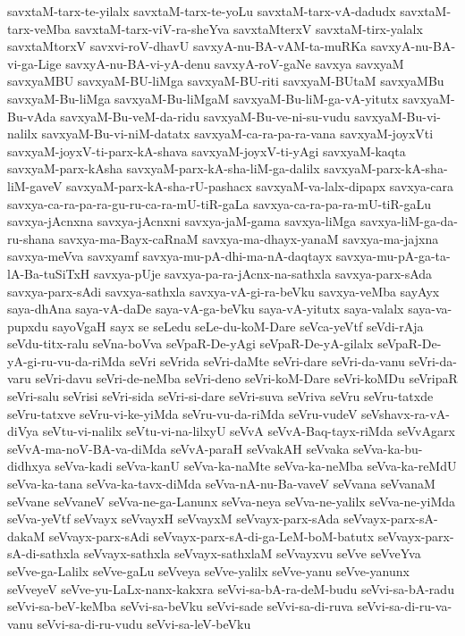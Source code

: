 {savxtaM-tarx-te-yilalx
savxtaM-tarx-te-yoLu
savxtaM-tarx-vA-dadudx
savxtaM-tarx-veMba
savxtaM-tarx-viV-ra-sheYva
savxtaMterxV
savxtaM-tirx-yalalx
savxtaMtorxV
savxvi-roV-dhavU
savxyA-nu-BA-vAM-ta-muRKa
savxyA-nu-BA-vi-ga-Lige
savxyA-nu-BA-vi-yA-denu
savxyA-roV-gaNe
savxya
savxyaM
savxyaMBU
savxyaM-BU-liMga
savxyaM-BU-riti
savxyaM-BUtaM
savxyaMBu
savxyaM-Bu-liMga
savxyaM-Bu-liMgaM
savxyaM-Bu-liM-ga-vA-yitutx
savxyaM-Bu-vAda
savxyaM-Bu-veM-da-ridu
savxyaM-Bu-ve-ni-su-vudu
savxyaM-Bu-vi-nalilx
savxyaM-Bu-vi-niM-datatx
savxyaM-ca-ra-pa-ra-vana
savxyaM-joyxVti
savxyaM-joyxV-ti-parx-kA-shava
savxyaM-joyxV-ti-yAgi
savxyaM-kaqta
savxyaM-parx-kAsha
savxyaM-parx-kA-sha-liM-ga-dalilx
savxyaM-parx-kA-sha-liM-gaveV
savxyaM-parx-kA-sha-rU-pashacx
savxyaM-va-lalx-dipapx
savxya-cara
savxya-ca-ra-pa-ra-gu-ru-ca-ra-mU-tiR-gaLa
savxya-ca-ra-pa-ra-mU-tiR-gaLu
savxya-jAcnxna
savxya-jAcnxni
savxya-jaM-gama
savxya-liMga
savxya-liM-ga-da-ru-shana
savxya-ma-Bayx-caRnaM
savxya-ma-dhayx-yanaM
savxya-ma-jajxna
savxya-meVva
savxyamf
savxya-mu-pA-dhi-ma-nA-daqtayx
savxya-mu-pA-ga-ta-lA-Ba-tuSiTxH
savxya-pUje
savxya-pa-ra-jAcnx-na-sathxla
savxya-parx-sAda
savxya-parx-sAdi
savxya-sathxla
savxya-vA-gi-ra-beVku
savxya-veMba
sayAyx
saya-dhAna
saya-vA-daDe
saya-vA-ga-beVku
saya-vA-yitutx
saya-valalx
saya-va-pupxdu
sayoVgaH
sayx
se
seLedu
seLe-du-koM-Dare
seVca-yeVtf
seVdi-rAja
seVdu-titx-ralu
seVna-boVva
seVpaR-De-yAgi
seVpaR-De-yA-gilalx
seVpaR-De-yA-gi-ru-vu-da-riMda
seVri
seVrida
seVri-daMte
seVri-dare
seVri-da-vanu
seVri-da-varu
seVri-davu
seVri-de-neMba
seVri-deno
seVri-koM-Dare
seVri-koMDu
seVripaR
seVri-salu
seVrisi
seVri-sida
seVri-si-dare
seVri-suva
seVriva
seVru
seVru-tatxde
seVru-tatxve
seVru-vi-ke-yiMda
seVru-vu-da-riMda
seVru-vudeV
seVshavx-ra-vA-diVya
seVtu-vi-nalilx
seVtu-vi-na-lilxyU
seVvA
seVvA-Baq-tayx-riMda
seVvAgarx
seVvA-ma-noV-BA-va-diMda
seVvA-paraH
seVvakAH
seVvaka
seVva-ka-bu-didhxya
seVva-kadi
seVva-kanU
seVva-ka-naMte
seVva-ka-neMba
seVva-ka-reMdU
seVva-ka-tana
seVva-ka-tavx-diMda
seVva-nA-nu-Ba-vaveV
seVvana
seVvanaM
seVvane
seVvaneV
seVva-ne-ga-Lanunx
seVva-neya
seVva-ne-yalilx
seVva-ne-yiMda
seVva-yeVtf
seVvayx
seVvayxH
seVvayxM
seVvayx-parx-sAda
seVvayx-parx-sA-dakaM
seVvayx-parx-sAdi
seVvayx-parx-sA-di-ga-LeM-boM-batutx
seVvayx-parx-sA-di-sathxla
seVvayx-sathxla
seVvayx-sathxlaM
seVvayxvu
seVve
seVveYva
seVve-ga-Lalilx
seVve-gaLu
seVveya
seVve-yalilx
seVve-yanu
seVve-yanunx
seVveyeV
seVve-yu-LaLx-nanx-kakxra
seVvi-sa-bA-ra-deM-budu
seVvi-sa-bA-radu
seVvi-sa-beV-keMba
seVvi-sa-beVku
seVvi-sade
seVvi-sa-di-ruva
seVvi-sa-di-ru-va-vanu
seVvi-sa-di-ru-vudu
seVvi-sa-leV-beVku
}

